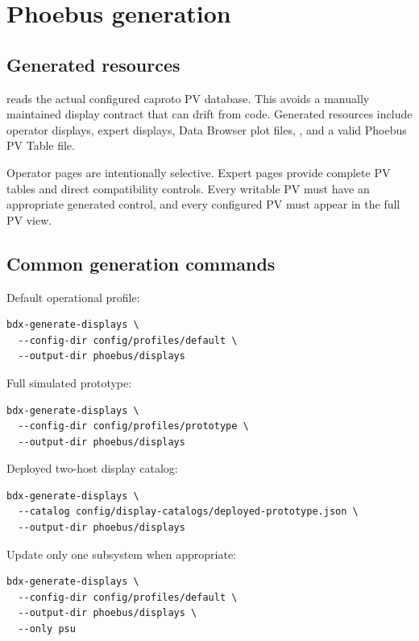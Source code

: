\section{Phoebus generation}

\subsection{Generated resources}

 reads the actual configured caproto PV database. This avoids a manually maintained display contract that can drift from code. Generated resources include operator displays, expert displays, Data Browser plot files, , and a valid Phoebus PV Table file.

Operator pages are intentionally selective. Expert pages provide complete PV tables and direct compatibility controls. Every writable PV must have an appropriate generated control, and every configured PV must appear in the full PV view.

\subsection{Common generation commands}

Default operational profile:

\begin{lstlisting}[style=shell]
bdx-generate-displays \
  --config-dir config/profiles/default \
  --output-dir phoebus/displays
\end{lstlisting}

Full simulated prototype:

\begin{lstlisting}[style=shell]
bdx-generate-displays \
  --config-dir config/profiles/prototype \
  --output-dir phoebus/displays
\end{lstlisting}

Deployed two-host display catalog:

\begin{lstlisting}[style=shell]
bdx-generate-displays \
  --catalog config/display-catalogs/deployed-prototype.json \
  --output-dir phoebus/displays
\end{lstlisting}

Update only one subsystem when appropriate:

\begin{lstlisting}[style=shell]
bdx-generate-displays \
  --config-dir config/profiles/default \
  --output-dir phoebus/displays \
  --only psu
\end{lstlisting}

